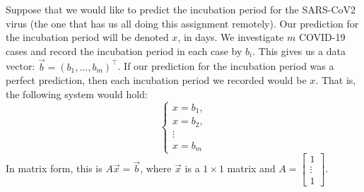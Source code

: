 \documentclass[]{exam}
\begin{document}
\begin{questions}
	\question Suppose that we would like to predict the incubation period for the SARS-CoV2 virus (the one that has us all doing this assignment remotely).
	Our prediction for the incubation period will be denoted $x$, in days.
	We investigate $m$ COVID-19 cases and record the incubation period in each case by $b_i$.
	This gives us a data vector: $\vec{b} = (b_1, \ldots, b_m)^\intercal$.
	If our prediction for the incubation period was a perfect prediction,
	then each incubation period we recorded would be $x$.
	That is, the following system would hold:
	\[
	\begin{cases}
	x=b_1, \\
	x=b_2, \\
	\vdots \\
	x=b_m
	\end{cases}
	\] 
	In matrix form, this is $A\vec{x}=\vec{b}$, where $\vec{x}$ is a $1 \times 1$ matrix and $A = \begin{bmatrix}1 \\ \vdots \\ 1\end{bmatrix}$.
	
\end{questions}
\end{document}
